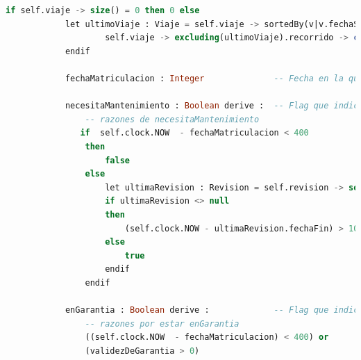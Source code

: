 \documentclass[12pt.a4paper]{article}
\begin{document}
\begin{lstlisting}[style = useNormal,language=SQL, caption={Codigo Use del apartado B}]
            if self.viaje -> size() = 0 then 0 else
            let ultimoViaje : Viaje = self.viaje -> sortedBy(v|v.fechaSalida) -> last() in
                    self.viaje -> excluding(ultimoViaje).recorrido -> collect(dist | dist.distancia) -> sum() + ultimoViaje.kmViaje
            endif
            
            fechaMatriculacion : Integer              -- Fecha en la que el coche se puso en funcionamiento en nuestro sistema
    
            necesitaMantenimiento : Boolean derive :  -- Flag que indica que el coche necesita ir a revision Tipo: Mantenimiento
                -- razones de necesitaMantenimiento
               if  self.clock.NOW  - fechaMatriculacion < 400 
                then 
                    false
                else 
                    let ultimaRevision : Revision = self.revision -> select(rev | rev.tipo = TipoRevision::Mantenimiento) -> sortedBy(r | r.fechaInicio) -> last() in
                    if ultimaRevision <> null
                    then 
                        (self.clock.NOW - ultimaRevision.fechaFin) > 100 
                    else 
                        true
                    endif
                endif
                
            enGarantia : Boolean derive :             -- Flag que indica que el coche tiene una garantia activa
                -- razones por estar enGarantia
                ((self.clock.NOW  - fechaMatriculacion) < 400) or
                (validezDeGarantia > 0)
    

\end{lstlisting}
\end{document}
